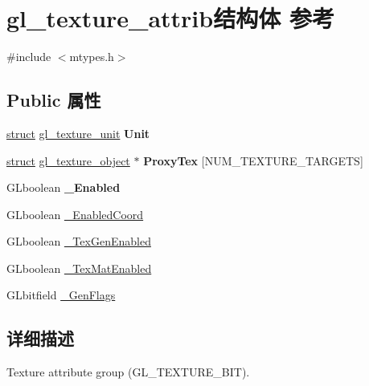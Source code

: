 \hypertarget{structgl__texture__attrib}{}\section{gl\+\_\+texture\+\_\+attrib结构体 参考}
\label{structgl__texture__attrib}


{\ttfamily \#include $<$mtypes.\+h$>$}

\subsection*{Public 属性}
\begin{DoxyCompactItemize}
\item 
\mbox{\label{structgl__texture__attrib_abdfa80a4ae16e8c1fcc1bca7207615bb}} 
\hyperlink{interfacestruct}{struct} \hyperlink{structgl__texture__unit}{gl\+\_\+texture\+\_\+unit} {\bfseries Unit}
\item 
\mbox{\label{structgl__texture__attrib_aff9f1a617910f49abe8ea8f19a1ad3e0}} 
\hyperlink{interfacestruct}{struct} \hyperlink{structgl__texture__object}{gl\+\_\+texture\+\_\+object} $\ast$ {\bfseries Proxy\+Tex} \mbox{[}N\+U\+M\+\_\+\+T\+E\+X\+T\+U\+R\+E\+\_\+\+T\+A\+R\+G\+E\+TS\mbox{]}
\item 
\mbox{\label{structgl__texture__attrib_a44bcd5ebf47b17381e0596d180428185}} 
G\+Lboolean {\bfseries \+\_\+\+Enabled}
\item 
G\+Lboolean \hyperlink{structgl__texture__attrib_af2d8c315c6b2da28690a53759d2927fe}{\+\_\+\+Enabled\+Coord}
\item 
G\+Lboolean \hyperlink{structgl__texture__attrib_a0bbdd300e1efef53c0a90aa499d549d3}{\+\_\+\+Tex\+Gen\+Enabled}
\item 
G\+Lboolean \hyperlink{structgl__texture__attrib_ac310876fcad700d07424fe790a1478e8}{\+\_\+\+Tex\+Mat\+Enabled}
\item 
G\+Lbitfield \hyperlink{structgl__texture__attrib_af7648dfe5b2bc4323e7eadd39ee4b979}{\+\_\+\+Gen\+Flags}
\end{DoxyCompactItemize}


\subsection{详细描述}
Texture attribute group (G\+L\+\_\+\+T\+E\+X\+T\+U\+R\+E\+\_\+\+B\+IT). 

